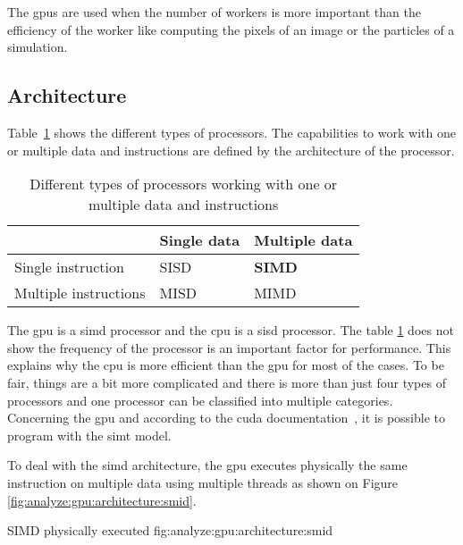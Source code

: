 The \acrshort{gpu}s are used when the number of workers is more important than
the efficiency of the worker like computing the pixels of an image or the
particles of a simulation.




\subsection{Architecture}
\label{ch:analyze:gpu:architecture}

Table~\ref{tab:analyze:gpu:architecture:instruction-data} shows the
different types of processors.
The capabilities to work with one or multiple data and instructions are defined
by the architecture of the processor.

\begin{table}[ht]
    \centering
    \begin{tabular}{l|l|l|}
                          & Single data & Multiple data \\ \hline
    Single instruction    & SISD        & \textbf{SIMD}  \\ \hline
    Multiple instructions & MISD        & MIMD           \\ \hline
    \end{tabular}
    \caption{Different types of processors working with one or multiple data and instructions}
    \label{tab:analyze:gpu:architecture:instruction-data}
\end{table}

The \acrshort{gpu} is a \acrshort{simd} processor and the \acrshort{cpu} is a
\acrshort{sisd} processor.
The table \ref{tab:analyze:gpu:architecture:instruction-data} does not show the
frequency of the processor is an important factor for performance.
This explains why the \acrshort{cpu} is more efficient than the \acrshort{gpu}
for most of the cases.
To be fair, things are a bit more complicated and there is more than just
four types of processors and one processor can be classified into multiple
categories.
Concerning the \acrshort{gpu} and according to the \acrshort{cuda}
documentation~\cite{cuda-programming-simt}, it is possible to program with the
\acrlong{simt} model.

To deal with the \acrshort{simd} architecture, the \acrshort{gpu} executes
physically the same instruction on multiple data using multiple threads as shown
on Figure \ref{fig:analyze:gpu:architecture:smid}.

{SIMD physically executed}
{fig:analyze:gpu:architecture:smid}

